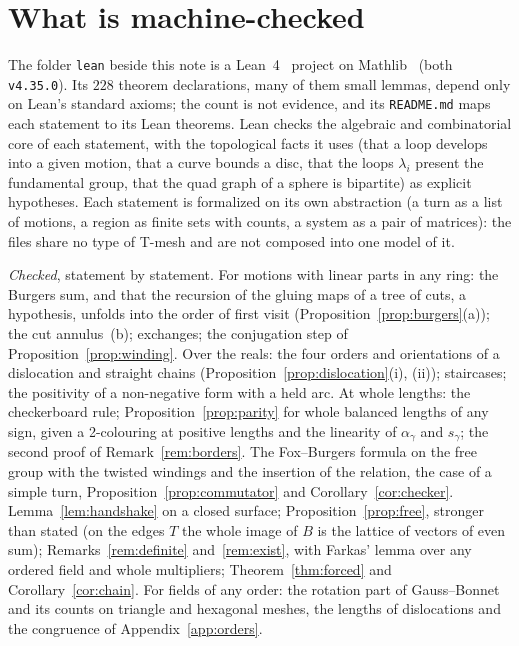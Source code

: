 \documentclass[11pt,a4paper]{article}
\newcommand{\shift}{s}
\begin{document}
\section{What is machine-checked}\label{sec:lean}

The folder \texttt{lean} beside this note is a Lean~4~\cite{demoura2021lean4}
project on Mathlib~\cite{mathlib2020} (both \texttt{v4.35.0}). Its $228$
theorem declarations, many of them small lemmas, depend only on Lean's
standard axioms; the count is not evidence, and its \texttt{README.md} maps
each statement to its Lean theorems. Lean checks the algebraic and
combinatorial core of each statement, with the topological facts it uses
(that a loop develops into a given motion, that a curve bounds a disc, that
the loops $\lambda_i$ present the fundamental group, that the quad graph of a
sphere is bipartite) as explicit hypotheses. Each statement is formalized on
its own abstraction (a turn as a list of motions, a region as finite sets with
counts, a system as a pair of matrices): the files share no type of T-mesh
and are not composed into one model of it.

\emph{Checked}, statement by statement. For motions with linear parts in any
ring: the Burgers sum, and that the recursion of the gluing maps of a tree of
cuts, a hypothesis, unfolds into the order of first visit
(Proposition~\ref{prop:burgers}(a)); the cut annulus~(b); exchanges; the
conjugation step of Proposition~\ref{prop:winding}. Over the reals: the four
orders and orientations of a dislocation and straight chains
(Proposition~\ref{prop:dislocation}(i), (ii)); staircases; the positivity of
a non-negative form with a held arc. At whole lengths: the checkerboard rule;
Proposition~\ref{prop:parity} for whole balanced lengths of any sign, given a
2-colouring at positive lengths and the linearity of $\alpha_\gamma$ and
$\shift_\gamma$; the second proof of Remark~\ref{rem:borders}. The
Fox--Burgers formula on the free group with the twisted windings and the
insertion of the relation, the case of a simple turn,
Proposition~\ref{prop:commutator} and Corollary~\ref{cor:checker}.
Lemma~\ref{lem:handshake} on a closed surface; Proposition~\ref{prop:free},
stronger than stated (on the edges $T$ the whole image of $B$ is the lattice
of vectors of even sum); Remarks~\ref{rem:definite} and~\ref{rem:exist}, with
Farkas' lemma over any ordered field and whole multipliers;
Theorem~\ref{thm:forced} and Corollary~\ref{cor:chain}. For fields of any
order: the rotation part of Gauss--Bonnet and its counts on triangle and
hexagonal meshes, the lengths of dislocations and the congruence of
Appendix~\ref{app:orders}.
\end{document}
